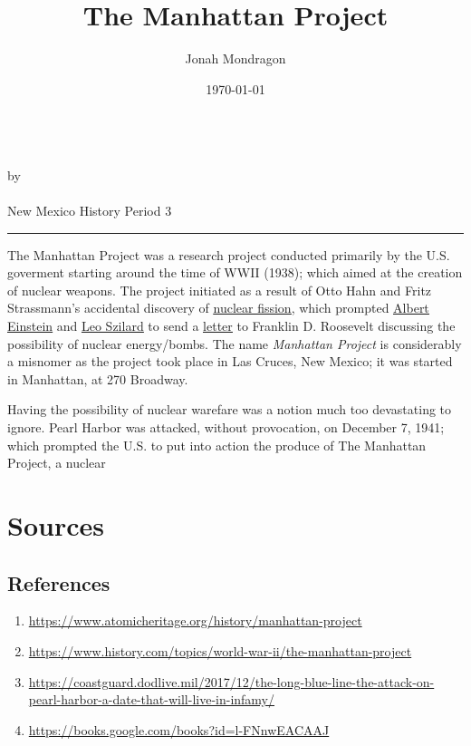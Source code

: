 \documentclass[12pt]{article}
\newcommand{\PutTitle}[1]
{
    \begin{center}
        {\huge\bfseries\thetitle}\\
        by \theauthor\\
        \thedate\\
        #1
    \end{center}
    \hrule
    \vspace{2ex}
}
\begin{document}
\title{The Manhattan Project}
\author{Jonah Mondragon}
\date{\today}
\PutTitle{New Mexico History Period 3}

\pagestyle{headings}
\thispagestyle{empty}
\doublespacing

The Manhattan Project was a research project conducted primarily by the U.S. goverment starting around the time of WWII (1938); which aimed at the creation of nuclear weapons.
The project initiated as a result of Otto Hahn and Fritz Strassmann's accidental discovery of {\color{blue}\underline{\href{http://nuclearconnect.org/know-nuclear/science/nuclear-fission}{nuclear fission}}},
    which prompted {\color{blue}\underline{\href{https://www.nobelprize.org/prizes/physics/1921/einstein/biographical/}{Albert Einstein}}} and {\color{blue}\underline{\href{https://www.jewishvirtuallibrary.org/leo-szilard}{Leo Szilard}}} to send a 
    {\color{blue}\underline{\href{https://www.osti.gov/opennet/manhattan-project-history/Events/1939-1942/einstein_letter.htm}{letter}}} to Franklin D. Roosevelt discussing the possibility of nuclear energy/bombs.
The name \textit{Manhattan Project} is considerably a misnomer as the project took place in Las Cruces, New Mexico; it was started in Manhattan, at 270 Broadway.

Having the possibility of nuclear warefare was a notion much too devastating to ignore.
Pearl Harbor was attacked, without provocation, on December 7, 1941; which prompted the U.S. to put into action the produce of The Manhattan Project, a nuclear 

\newpage

\section*{Sources}
\subsection*{References}
\begin{enumerate}
    \item{\url{https://www.atomicheritage.org/history/manhattan-project}}
    \item{\url{https://www.history.com/topics/world-war-ii/the-manhattan-project}}
    \item{\url{https://coastguard.dodlive.mil/2017/12/the-long-blue-line-the-attack-on-pearl-harbor-a-date-that-will-live-in-infamy/}}
    \item{\url{https://books.google.com/books?id=l-FNnwEACAAJ}}
\end{enumerate}
\end{document}
